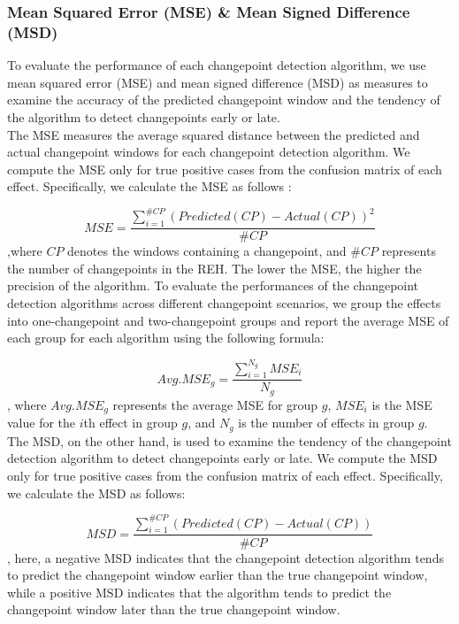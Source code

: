 \documentclass[]{interact}
\theoremstyle{plain}%
\theoremstyle{definition}
\theoremstyle{remark}
\begin{document}
{	\subsubsection{Mean Squared Error (MSE) \& Mean Signed Difference (MSD)}
	
	\hspace{0.28cm} To evaluate the performance of each changepoint detection algorithm, we use mean squared error (MSE) and mean signed difference (MSD) as measures to examine the accuracy of the predicted changepoint window and the tendency of the algorithm to detect changepoints early or late. \\
	
	The MSE measures the average squared distance between the predicted and actual changepoint windows for each changepoint detection algorithm. We compute the MSE only for true positive cases from the confusion matrix of each effect. Specifically, we calculate the MSE as follows \cite{aminikhanghahiSurveyMethodsTime2017}:
	
	\begin{equation} \label{9}
		MSE = \frac{\sum_{i = 1}^{\#CP} (Predicted(CP) - Actual(CP))^2}{\#CP}
	\end{equation}
	,where $CP$ denotes the windows containing a changepoint, and $\#CP$ represents the number of changepoints in the REH. The lower the MSE, the higher the precision of the algorithm. To evaluate the performances of the changepoint detection algorithms across different changepoint scenarios, we group the effects into one-changepoint and two-changepoint groups and report the average MSE of each group for each algorithm using the following formula:
	
	\begin{equation} \label{10}
		Avg.MSE_g = \frac{\sum_{i=1}^{N_g} MSE_i}{N_g}
	\end{equation}
	, where $Avg.MSE_g$ represents the average MSE for group $g$, $MSE_i$ is the MSE value for the $i$th effect in group $g$, and $N_g$ is the number of effects in group $g$. \\
	
	The MSD, on the other hand, is used to examine the tendency of the changepoint detection algorithm to detect changepoints early or late. We compute the MSD only for true positive cases from the confusion matrix of each effect. Specifically, we calculate the MSD as follows:
	
	\begin{equation} \label{11}
		MSD = \frac{\sum_{i = 1}^{\#CP} (Predicted(CP) - Actual(CP))}{\#CP}
	\end{equation}
	, here, a negative MSD indicates that the changepoint detection algorithm tends to predict the changepoint window earlier than the true changepoint window, while a positive MSD indicates that the algorithm tends to predict the changepoint window later than the true changepoint window. \\
	
}
\end{document}
